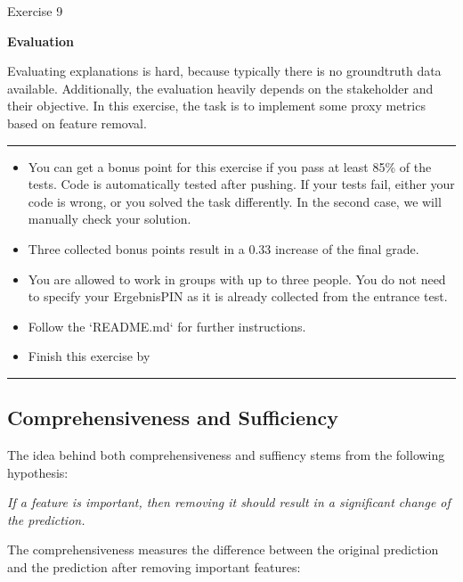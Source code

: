 \documentclass[a4paper]{article}
\begin{document}
{\noindent\LARGE Exercise 9\par}
\vspace{8pt}
{\noindent\huge\textbf{Evaluation}}
\vspace{20pt}

\noindent
Evaluating explanations is hard, because typically there is no groundtruth data available.
Additionally, the evaluation heavily depends on the stakeholder and their objective.
In this exercise, the task is to implement some proxy metrics based on feature removal.

\par\noindent\rule{\textwidth}{0.2pt}
\begin{itemize}
    \item You can get a bonus point for this exercise if you pass at least 85\% of the tests. Code is automatically tested after pushing. If your tests fail, either your code is wrong, or you solved the task differently. In the second case, we will manually check your solution.
    \item Three collected bonus points result in a 0.33 increase of the final grade.
    \item You are allowed to work in groups with up to three people. You do not need to specify your ErgebnisPIN as it is already collected from the entrance test.
    \item Follow the `README.md` for further instructions.
    \item Finish this exercise by \color{red}{17th December, 2021 at 11:59 pm.}
\end{itemize}
\par\noindent\rule{\textwidth}{0.2pt}
\vspace{10pt}

\noindent
\subsection*{Comprehensiveness and Sufficiency}
The idea behind both comprehensiveness and suffiency stems from the following hypothesis:
\begin{center}
    \textit{If a feature is important, then removing it should result in a significant change of the prediction.}
\end{center}
The comprehensiveness measures the difference between the original prediction and the prediction after removing important features:
\end{document}
